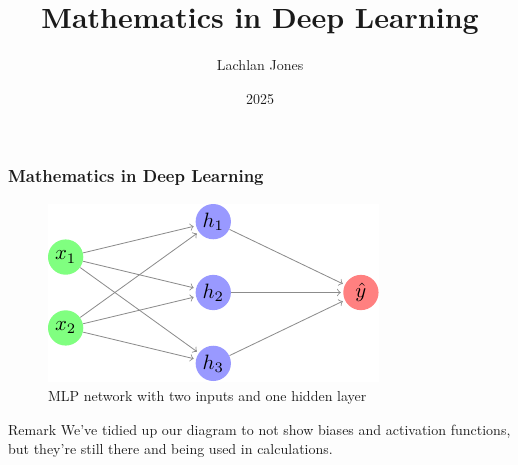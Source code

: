\documentclass{beamer}
\title{Mathematics in Deep Learning}
\author{Lachlan Jones}
\institute{MATH199}
\date{2025}
\begin{document}
\frame{\titlepage}

\begin{frame}
    \frametitle{Mathematics in Deep Learning}
    \begin{figure}
        \includegraphics{figures/basic-mlp/main.pdf}
        \caption{MLP network with two inputs and one hidden layer}
    \end{figure}
    \begin{block}{Remark}
        We've tidied up our diagram to not show biases and activation functions, but they're still there and being used in calculations.
    \end{block}
\end{frame}
\end{document}
